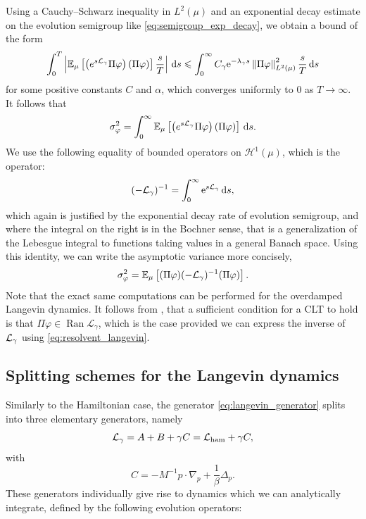         Using a Cauchy--Schwarz inequality in $L^2(\mu)$ and an exponential decay estimate on the evolution semigroup like \eqref{eq:semigroup_exp_decay}, we obtain a bound of the form
        \[\int_0^T\left|\mathbb{E}_\mu\left[\left(e^{s\mathcal{L}_\gamma}\Pi\varphi\right)\left(\Pi\varphi\right)\right]\frac{s}{T}\right|\,\mathrm{d} s\leqslant \int_0^\infty C_\gamma\mathrm{e}^{-\lambda_\gamma s}\left\|\Pi\varphi\right\|^2_{L^2(\mu)}\frac{s}{T}\,\mathrm{d} s\]
        for some positive constants $C$ and $\alpha$, which converges uniformly to $0$ as $T\to \infty$. It follows that 
        \begin{equation}
            \label{eq:asymptotic_variance_with_semigroup}
            \sigma_{\varphi}^2=\int_0^\infty \mathbb{E}_\mu\left[\left(e^{s\mathcal{L}_\gamma}\Pi\varphi\right)\left(\Pi\varphi\right)\right]\,\mathrm{d} s.
        \end{equation}
        We use the following equality of bounded operators on $\mathcal{H}^1(\mu)$, which is the operator:
        \begin{equation}
            \label{eq:resolvent_langevin}
            (-\mathcal{L}_\gamma)^{-1}=\int_0^\infty \mathrm{e}^{s\mathcal{L}_\gamma}\,\mathrm{d} s,
        \end{equation}
        which again is justified by the exponential decay rate of evolution semigroup, and where the integral on the right is in the Bochner sense, that is a generalization of the Lebesgue integral to functions taking values in a general Banach space.
        Using this identity, we can write the asymptotic variance more concisely,
        \begin{equation}
            \label{eq:asymptotic_variance_with_Lm1}
            \sigma_{\varphi}^2=\mathbb{E}_{\mu}\left[(\Pi\varphi) (-\mathcal{L}_\gamma)^{-1}(\Pi \varphi)\right].
        \end{equation}
        Note that the exact same computations can be performed for the overdamped Langevin dynamics. 
        It follows from \cite[Theorem 2.1]{B82}, that a sufficient condition for a CLT to hold is that $\Pi \varphi\in \operatorname{Ran}\mathcal L_\gamma$, which is the case provided we can express the inverse of $\mathcal{L}_\gamma$ using \eqref{eq:resolvent_langevin}.
\subsection{Splitting schemes for the Langevin dynamics}\label{section:splitting_schemes_langevin}

Similarly to the Hamiltonian case, the generator \eqref{eq:langevin_generator} splits into three elementary generators, namely 
$$\mathcal L_\gamma= A+B+\gamma C=\mathcal{L}_{\rm ham} +\gamma C,$$
with
\begin{equation}
  \label{eq:C_definition}
C=-M^{-1}p\cdot \nabla_p +\frac1\beta \Delta_p.
\end{equation}
These generators individually give rise to dynamics which we can analytically integrate, defined by the following evolution operators:

